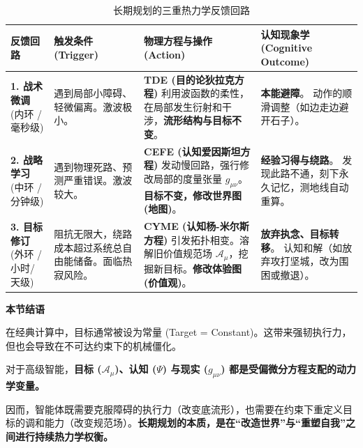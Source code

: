 \begin{table}[htbp]
\centering
\footnotesize
\renewcommand{\arraystretch}{1.5}
\begin{tabularx}{\textwidth}{l|X|X|X}
\toprule
\rowcolor{structurecolor!20} \textbf{反馈回路} & \textbf{触发条件 (Trigger)} & \textbf{物理方程与操作 (Action)} & \textbf{认知现象学 (Cognitive Outcome)} \\
\midrule

\textbf{1. 战术微调} \newline (内环 / 毫秒级) & 遇到局部小障碍、轻微偏离。激波极小。 & \textbf{TDE (目的论狄拉克方程)} \newline 利用波函数的柔性，在局部发生衍射和干涉，\textbf{流形结构与目标不变}。 & \textbf{本能避障}。 \newline 动作的顺滑调整（如边走边避开石子）。 \\
\hline

\textbf{2. 战略学习} \newline (中环 / 分钟级) & 遇到物理死路、预测严重错误。激波较大。 & \textbf{CEFE (认知爱因斯坦方程)} \newline 发动慢回路，强行修改局部的度量张量 $g_{\mu\nu}$。 \textbf{目标不变，修改世界图 (地图)}。 & \textbf{经验习得与绕路}。 \newline 发现此路不通，刻下永久记忆，测地线自动重算。 \\
\hline

\textbf{3. 目标修订} \newline (外环 / 小时/天级) & 阻抗无限大，绕路成本超过系统总自由能储备。面临热寂风险。 & \textbf{CYME (认知杨-米尔斯方程)} \newline 引发拓扑相变。溶解旧价值规范场 $\mathcal{A}_\mu$，挖掘新目标。\textbf{修改体验图 (价值观)}。 & \textbf{放弃执念、目标转移}。 \newline 认知和解（如放弃攻打坚城，改为围困或撤退）。 \\

\bottomrule
\end{tabularx}
\caption{长期规划的三重热力学反馈回路}
\end{table}

\begin{bquote}
    \textbf{本节结语}

    在经典计算中，目标通常被设为常量 (Target = Constant)。这带来强韧执行力，但也会导致在不可达约束下的机械僵化。

    对于高级智能，\textbf{目标 ($\mathcal{A}_\mu$)、认知 ($\Psi$) 与现实 ($g_{\mu\nu}$) 都是受偏微分方程支配的动力学变量。}

    因而，智能体既需要克服障碍的执行力（改变底流形），也需要在约束下重定义目标的调和能力（改变规范场）。\textbf{长期规划的本质，是在“改造世界”与“重塑自我”之间进行持续热力学权衡。}
\end{bquote}

